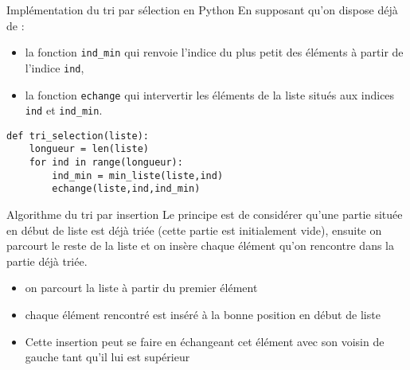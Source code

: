 \documentclass[10pt]{beamer}
\begin{document}
\begin{frame}[fragile]
	\mframe{\Algotris}
	\begin{block}{Implémentation du tri par sélection en Python}
		En supposant qu'on dispose déjà de :
		\begin{itemize}
			\item la fonction \texttt{ind\_min} qui renvoie l'indice du plus petit des éléments  à partir de l'indice \texttt{ind},
			\item la fonction \texttt{echange} qui intervertir les éléments de la liste situés aux indices \texttt{ind} et \texttt{ind\_min}.
		\end{itemize}
		\begin{lstlisting}
def tri_selection(liste):
    longueur = len(liste)
    for ind in range(longueur):
        ind_min = min_liste(liste,ind)
        echange(liste,ind,ind_min)
\end{lstlisting}
	\end{block}
\end{frame}


\begin{frame}
	\mframe{\Algotris}
	\begin{alertblock}{Algorithme du tri par insertion}
        Le principe est de considérer qu'une partie située en début de liste est déjà triée (cette partie est initialement vide), ensuite on parcourt le reste de la liste et on insère chaque élément qu'on rencontre dans la partie déjà triée.
		\begin{itemize}
			\item<1-> on parcourt la liste à partir du premier élément
			\item<2-> chaque élément rencontré est inséré à la bonne position en début de liste
			\item<3-> Cette insertion peut se faire en échangeant cet élément avec son voisin de gauche tant qu'il lui est supérieur
		\end{itemize}
	\end{alertblock}
\end{frame}
\end{document}

